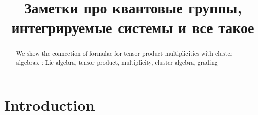 \documentclass[12pt]{article}
\begin{document}
\title{Заметки про квантовые группы, интегрируемые системы и все такое}



\begin{abstract}

  We show the connection of formulae for tensor product multiplicities with cluster algebras. 
  : Lie algebra, tensor product, multiplicity, cluster algebra, grading
\end{abstract}



\section{Introduction}
\label{sec:introduction}
\cite{di2013quantum}
{} 

\end{document}
